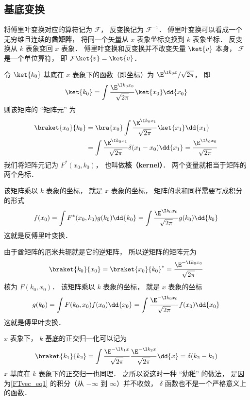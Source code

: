\subsection{基底变换}

将傅里叶变换对应的算符记为 $\mathcal F$， 反变换记为 $\mathcal F^{-1}$． 傅里叶变换可以看成一个无穷维且连续的\textbf{酋矩阵}， 将同一个矢量从 $x$ 表象坐标变换到 $k$ 表象坐标． 反变换从 $k$ 表象变回 $x$ 表象． 傅里叶变换和反变换并不改变矢量 $\ket{v}$ 本身， $\mathcal F$ 是一个单位算符， 即 $\mathcal F \ket{v} = \ket{v}$．

令 $\ket{k_0}$ 基底在 $x$ 表象下的函数（即坐标）为 $\E^{\I k_0 x}/\sqrt{2\pi }$， 即
\begin{equation}
\ket{k_0} = \int \frac{\E^{\I k_0 x_0}}{\sqrt{2\pi }} \ket{x_0} \dd{x_0}
\end{equation}
则该矩阵的 “矩阵元” 为
\begin{equation}
\begin{aligned}
\braket{x_0}{k_0} &= \bra{x_0}\int \frac{\E^{\I k_0 x_1}}{\sqrt{2\pi }} \ket{x_1} \dd{x_1}\\
&= \int \frac{\E^{\I k_0 x_1}}{\sqrt{2\pi }} \delta (x_1 - x_0) \dd{x_1}
= \frac{\E^{\I k_0 x_0}}{\sqrt{2\pi }}
\end{aligned}
\end{equation}
我们将矩阵元记为 $F^*(x_0, k_0)$， 也叫做\textbf{核（kernel）}． 两个变量就相当于矩阵的两个角标．

该矩阵乘以 $k$ 表象的坐标， 就是 $x$ 表象的坐标， 矩阵的求和同样需要写成积分的形式
\begin{equation}
f(x_0) = \int F^*(x_0, k_0) g(k_0) \dd{k_0} = \int \frac{\E^{\I k_0 x_0}}{\sqrt{2\pi }} g(k_0) \dd{k_0}
\end{equation}
这就是反傅里叶变换．

由于酋矩阵的厄米共轭就是它的逆矩阵， 所以逆矩阵的矩阵元为
\begin{equation}
\braket{k_0}{x_0} = \braket{x_0}{k_0}^* = \frac{\E^{-\I k_0 x_0}}{\sqrt{2\pi }}
\end{equation}
核为 $F(k_0, x_0)$． 该矩阵乘以 $k$ 表象的坐标， 就是 $x$ 表象的坐标
\begin{equation}
g(k_0) = \int F(k_0, x_0) f(x_0) \dd{x_0} = \int \frac{\E^{-\I k_0 x_0}}{\sqrt{2\pi }} f(x_0) \dd{x_0}
\end{equation}
这就是傅里叶变换．

$x$ 表象下， $k$ 基底的正交归一化可以记为
\begin{equation}\label{FTvec_eq1}
\braket{k_1}{k_2} = \int \frac{\E^{-\I k_1 x}}{\sqrt{2\pi }} \frac{\E^{-\I k_2 x}}{\sqrt{2\pi }} \dd{x} = \delta (k_2 - k_1)
\end{equation}
$x$ 基底在 $k$ 表象下的正交归一也同理． 之所以说这时一种 “幼稚” 的做法， 是因为\autoref{FTvec_eq1} 的积分（从 $-\infty $ 到 $\infty$）并不收敛， $\delta $ 函数也不是一个严格意义上的函数．


